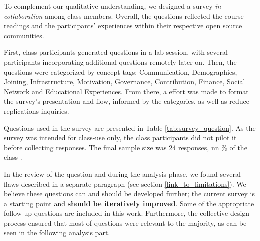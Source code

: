 

To complement our qualitative understanding, we designed a survey {\it in collaboration} among class members. Overall, the questions reflected the course  readings and the participants' experiences within their respective open source communities. 

First, class participants generated questions in a lab session, with several participants incorporating additional questions remotely later on.  Then, the questions were categorized by concept tags: Communication, Demographics, Joining, Infrastructure, Motivation, Governance, Contribution, Finance, Social Network and Educational Experiences. From there, a effort was made to format the survey's  presentation and flow, informed by the categories, as well as reduce replications inquiries.

Questions used in the survey  are presented in Table \ref{tab:survey_question}. As the survey was intended for class-use only, the class participants did not pilot it before collecting  responses. The final sample size was 24 responses, nn \% of the class .

In the review of the question and during the analysis phase, we found several flaws described in a separate paragraph (see section \ref{link_to_limitations}). We believe these questions can and should be developed further; the current survey is a starting point and {\bf should be iteratively improved}. Some of the appropriate follow-up questions are included in this work. Furthermore, the collective design process ensured that most of questions were relevant to the majority, as can be seen in the following analysis part.

